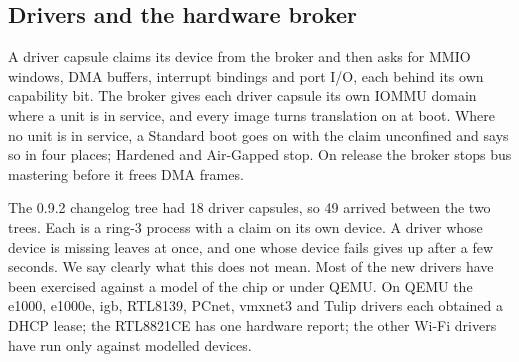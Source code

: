 \subsection{Drivers and the hardware broker}

A driver capsule claims its device from the broker and then asks for MMIO windows, DMA buffers, interrupt bindings and port I/O, each behind its own capability bit. The broker gives each driver capsule its own IOMMU domain where a unit is in service, and every image turns translation on at boot. Where no unit is in service, a Standard boot goes on with the claim unconfined and says so in four places; Hardened and Air-Gapped stop. On release the broker stops bus mastering before it frees DMA frames.

\begin{table}[t]
\centering
\caption{The 67 driver capsules by class, generated from the  directories that hold a . Which of them have run on real hardware and which only in their host model is in the hardware notes, and the answer for most is the second.}
\label{tab:drivers}

\end{table}

The 0.9.2 changelog tree had 18 driver capsules, so 49 arrived between the two trees. Each is a ring-3 process with a claim on its own device. A driver whose device is missing leaves at once, and one whose device fails gives up after a few seconds. We say clearly what this does not mean. Most of the new drivers have been exercised against a model of the chip or under QEMU. On QEMU the e1000, e1000e, igb, RTL8139, PCnet, vmxnet3 and Tulip drivers each obtained a DHCP lease; the RTL8821CE has one hardware report; the other Wi-Fi drivers have run only against modelled devices.
